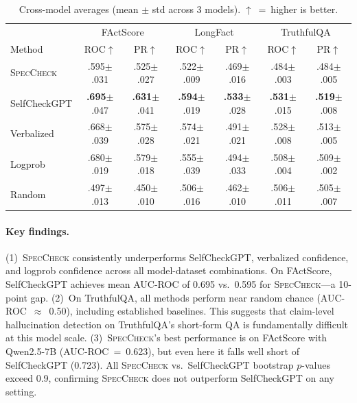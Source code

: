 \documentclass{article}
\newcommand{\speccheck}{\textsc{SpecCheck}}
\begin{document}
\begin{table}[t]
\centering
\caption{Cross-model averages (mean $\pm$ std across 3 models). $\uparrow$~=~higher is better.}
\label{tab:cross_model}
\begin{tabular}{lcccccc}
\toprule
& \multicolumn{2}{c}{FActScore} & \multicolumn{2}{c}{LongFact} & \multicolumn{2}{c}{TruthfulQA} \\
Method & ROC$\uparrow$ & PR$\uparrow$ & ROC$\uparrow$ & PR$\uparrow$ & ROC$\uparrow$ & PR$\uparrow$ \\
\midrule
\speccheck{} & .595{\scriptsize$\pm$.031} & .525{\scriptsize$\pm$.027} & .522{\scriptsize$\pm$.009} & .469{\scriptsize$\pm$.016} & .484{\scriptsize$\pm$.003} & .484{\scriptsize$\pm$.005} \\
SelfCheckGPT & \textbf{.695}{\scriptsize$\pm$.047} & \textbf{.631}{\scriptsize$\pm$.041} & \textbf{.594}{\scriptsize$\pm$.019} & \textbf{.533}{\scriptsize$\pm$.028} & \textbf{.531}{\scriptsize$\pm$.015} & \textbf{.519}{\scriptsize$\pm$.008} \\
Verbalized & .668{\scriptsize$\pm$.039} & .575{\scriptsize$\pm$.028} & .574{\scriptsize$\pm$.021} & .491{\scriptsize$\pm$.021} & .528{\scriptsize$\pm$.008} & .513{\scriptsize$\pm$.005} \\
Logprob & .680{\scriptsize$\pm$.019} & .579{\scriptsize$\pm$.018} & .555{\scriptsize$\pm$.039} & .494{\scriptsize$\pm$.033} & .508{\scriptsize$\pm$.004} & .509{\scriptsize$\pm$.002} \\
Random & .497{\scriptsize$\pm$.013} & .450{\scriptsize$\pm$.010} & .506{\scriptsize$\pm$.016} & .462{\scriptsize$\pm$.010} & .506{\scriptsize$\pm$.011} & .505{\scriptsize$\pm$.007} \\
\bottomrule
\end{tabular}
\end{table}

\paragraph{Key findings.}
(1)~\speccheck{} consistently underperforms SelfCheckGPT, verbalized confidence, and logprob confidence across all model-dataset combinations.
On FActScore, SelfCheckGPT achieves mean AUC-ROC of 0.695 vs.\ 0.595 for \speccheck{}---a 10-point gap.
(2)~On TruthfulQA, all methods perform near random chance (AUC-ROC~$\approx$~0.50), including established baselines.
This suggests that claim-level hallucination detection on TruthfulQA's short-form QA is fundamentally difficult at this model scale.
(3)~\speccheck{}'s best performance is on FActScore with Qwen2.5-7B (AUC-ROC~=~0.623), but even here it falls well short of SelfCheckGPT (0.723).
All \speccheck{} vs.\ SelfCheckGPT bootstrap $p$-values exceed 0.9, confirming \speccheck{} does not outperform SelfCheckGPT on any setting.
\end{document}
